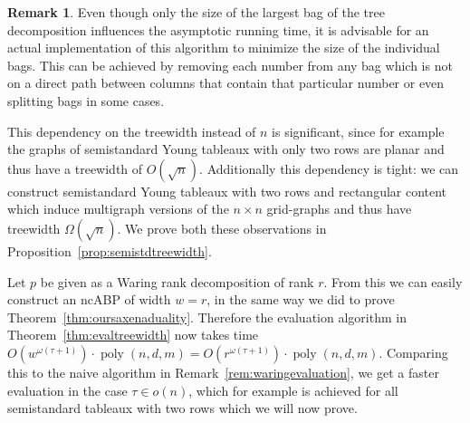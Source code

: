 \documentclass[10pt,a4paper]{article}
\numberwithin{equation}{section}
\theoremstyle{definition}
\newtheorem{remark}[equation]{Remark}
\DeclareMathOperator{\poly}{poly}
\begin{document}
\begin{remark}
    Even though only the size of the largest bag of the tree decomposition influences the asymptotic running time, it is advisable for an actual implementation of this algorithm to minimize the size of the individual bags.
    This can be achieved by removing each number from any bag which is not on a direct path between columns that contain that particular number or even splitting bags in some cases.
\end{remark}

This dependency on the treewidth instead of $n$ is significant, since for example the graphs of semistandard Young tableaux with only two rows are planar and thus have a treewidth of $O(\sqrt{n})$.
Additionally this dependency is tight: we can construct semistandard Young tableaux with two rows and rectangular content which induce multigraph versions of the $n \times n$ grid-graphs and thus have treewidth $\Omega(\sqrt{n})$.
We prove both these observations in Proposition~\ref{prop:semistdtreewidth}.

Let $p$ be given as a Waring rank decomposition of rank $r$.
From this we can easily construct an ncABP of width $w=r$, in the same way we did to prove Theorem~\ref{thm:oursaxenaduality}.
Therefore the evaluation algorithm in Theorem~\ref{thm:evaltreewidth} now takes time $O(w^{\omega(\tau+1)}) \cdot \poly(n,d,m) = O(r^{\omega(\tau+1)}) \cdot \poly(n,d,m)$.
Comparing this to the naive algorithm in Remark~\ref{rem:waringevaluation}, we get a faster evaluation in the case $\tau \in o(n)$, which for example is achieved for all semistandard tableaux with two rows which we will now prove.
\end{document}
